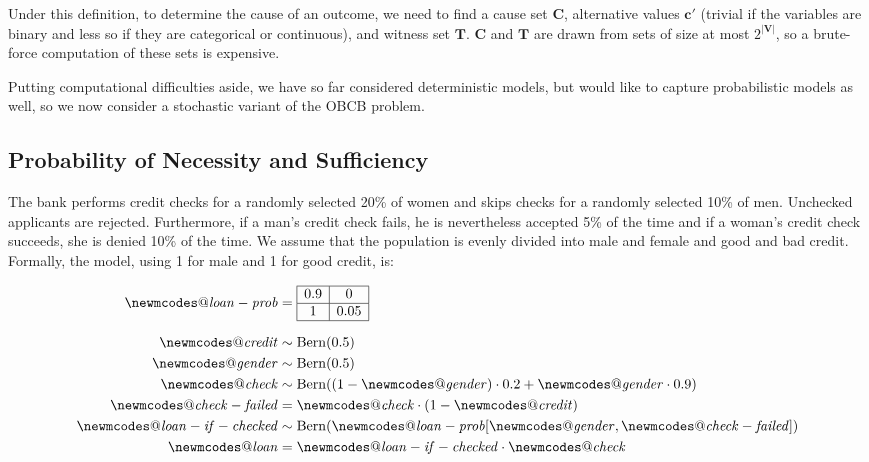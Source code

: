 \documentclass[anon,12pt]{clear2026} %
\makeatletter
\DeclareRobustCommand{\varname}[1]{\begingroup\newmcodes@\mathit{#1}\endgroup}
\makeatother
\begin{document}
Under this definition, to determine the cause of an outcome, we need to find a cause set $\mathbf{C}$, alternative values $\mathbf{c}'$ (trivial if the variables are binary and less so if they are categorical or continuous), and witness set $\mathbf{T}$.
$\mathbf{C}$ and $\mathbf{T}$ are drawn from sets of size at most $2^{|\mathbf{V}|}$, so a brute-force computation of these sets is expensive.

Putting computational difficulties aside, we have so far considered deterministic models, but would like to capture probabilistic models as well, so we now consider a stochastic variant of the OBCB problem.

\subsection{Probability of Necessity and Sufficiency}

\begin{example}\label{ex:obcb_stochastic}
The bank performs credit checks for a randomly selected 20\% of women and skips checks for a randomly selected 10\% of men.
Unchecked applicants are rejected.
Furthermore, if a man's credit check fails, he is nevertheless accepted 5\% of the time and if a woman's credit check succeeds, she is denied 10\% of the time.
We assume that the population is evenly divided into male and female and good and bad credit.
Formally, the model, using 1 for male and 1 for good credit, is:

\begin{align*}
\varname{loan-prob} &= 
\begin{array}{|c|c|}
\hline
0.9 & 0 \\
\hline
1 & 0.05 \\
\hline
\end{array}
\\[6pt]
\varname{credit} &\sim \mathrm{Bern}(0.5) \\
\varname{gender} &\sim \mathrm{Bern}(0.5) \\
\varname{check} &\sim \mathrm{Bern}((1-\varname{gender}) \cdot 0.2 + \varname{gender} \cdot 0.9) \\
\varname{check-failed} &= \varname{check} \cdot (1-\varname{credit}) \\
\varname{loan-if-checked} &\sim \mathrm{Bern}(\varname{loan-prob}[\varname{gender}, \varname{check-failed}]) \\
\varname{loan} &= \varname{loan-if-checked} \cdot \varname{check}
\end{align*}
\end{example}
\end{document}
